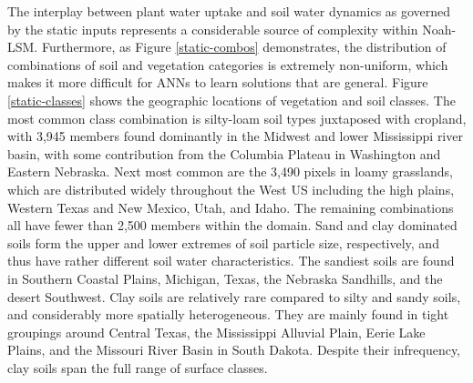 The interplay between plant water uptake and soil water dynamics as governed by the static inputs represents a considerable source of complexity within Noah-LSM. Furthermore, as Figure \ref{static-combos} demonstrates, the distribution of combinations of soil and vegetation categories is extremely non-uniform, which makes it more difficult for ANNs to learn solutions that are general. Figure \ref{static-classes} shows the geographic locations of vegetation and soil classes. The most common class combination is silty-loam soil types juxtaposed with cropland, with 3,945 members found dominantly in the Midwest and lower Mississippi river basin, with some contribution from the Columbia Plateau in Washington and Eastern Nebraska. Next most common are the 3,490 pixels in loamy grasslands, which are distributed widely throughout the West US including the high plains, Western Texas and New Mexico,  Utah, and Idaho. The remaining combinations all have fewer than 2,500 members within the domain. Sand and clay dominated soils form the upper and lower extremes of soil particle size, respectively, and thus have rather different soil water characteristics. The sandiest soils are found in Southern Coastal Plains, Michigan, Texas, the Nebraska Sandhills, and the desert Southwest. Clay soils are relatively rare compared to silty and sandy soils, and considerably more spatially heterogeneous. They are mainly found in tight groupings around Central Texas, the Mississippi Alluvial Plain, Eerie Lake Plains, and the Missouri River Basin in South Dakota. Despite their infrequency, clay soils span the full range of surface classes.

